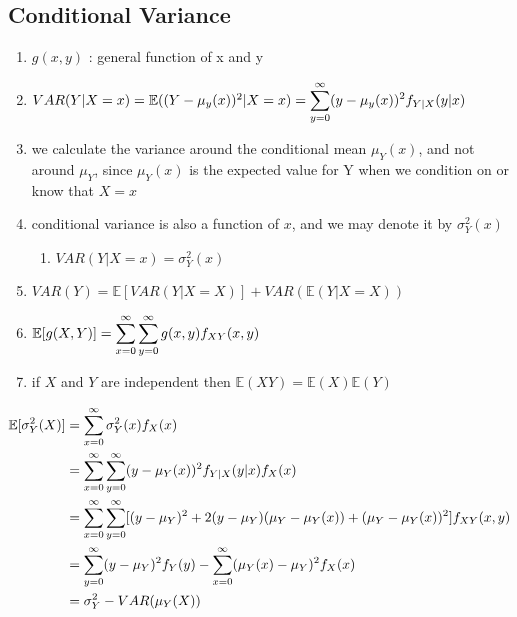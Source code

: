 \subsection{Conditional Variance \cite{ism-1}} \label{Multivariate Distributions: Conditional Variance}

\begin{enumerate}
    \item[] $g(x, y)$ : general function of x and y

    \item[] $
        VAR(Y|X=x) 
        = \mathbb{E}((Y-\mu_y(x))^2|X=x)
        = \displaystyle\sum_{y=0}^\infty
        (y-\mu_y(x))^2 f_{Y|X}(y|x)
    $

    \item we calculate the variance around the conditional mean $\mu _Y(x)$, and not around $\mu _Y$, since $\mu _Y(x)$ is the expected value for Y when we condition on or know that $X = x$

    \item conditional variance is also a function of $x$, and we may denote it by $\sigma _Y^2(x)$
    \begin{enumerate}
        \item[] $VAR(Y|X=x) = \sigma _Y^2(x)$

    \end{enumerate}

    \item $VAR(Y) = \mathbb{E}[VAR(Y|X = X)] + VAR(\mathbb{E}(Y|X = X))$

    \item $
        \mathbb{E}[g(X,Y)]
        =\displaystyle\sum_{x=0}^{\infty}
            \displaystyle\sum_{y=0}^{\infty}
            g(x,y) f_{XY}(x,y)
    $

    \item if $X$ and $Y$ are independent then $\mathbb{E}(XY) = \mathbb{E}(X)\mathbb{E}(Y)$
\end{enumerate}

\begin{align*}
    \mathbb{E}[\sigma^2_Y(X)]
    &= \displaystyle\sum_{x=0}^{\infty}
        \sigma_Y^2(x)f_X(x)\\
    &= \displaystyle\sum_{x=0}^{\infty}
        \displaystyle\sum_{y=0}^{\infty}
        (y - \mu_Y (x))^2 f_{Y |X} (y|x) f_X (x)\\
    &= \displaystyle\sum_{x=0}^{\infty}
        \displaystyle\sum_{y=0}^{\infty}
        [(y - \mu_Y ) ^2 + 2(y - \mu_Y )(\mu_Y - \mu_Y (x)) + (\mu_Y - \mu_Y (x))^2] f_{XY} (x, y)\\
    &= \displaystyle\sum_{y=0}^{\infty} 
        (y - \mu_Y )^2 f_Y (y) 
        - \displaystyle\sum_{x=0}^{\infty} 
        (\mu_Y (x) - \mu_Y ) ^2 f_X (x)\\
    &= \sigma_Y^2 - VAR(\mu_Y(X))
\end{align*}

